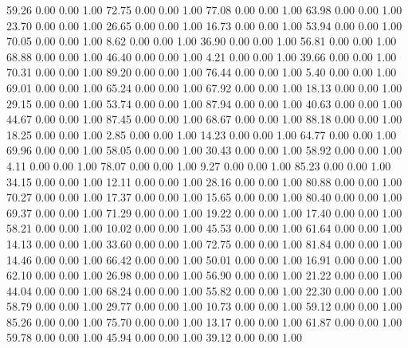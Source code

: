    59.26   0.00   0.00   1.00
   72.75   0.00   0.00   1.00
   77.08   0.00   0.00   1.00
   63.98   0.00   0.00   1.00
   23.70   0.00   0.00   1.00
   26.65   0.00   0.00   1.00
   16.73   0.00   0.00   1.00
   53.94   0.00   0.00   1.00
   70.05   0.00   0.00   1.00
    8.62   0.00   0.00   1.00
   36.90   0.00   0.00   1.00
   56.81   0.00   0.00   1.00
   68.88   0.00   0.00   1.00
   46.40   0.00   0.00   1.00
    4.21   0.00   0.00   1.00
   39.66   0.00   0.00   1.00
   70.31   0.00   0.00   1.00
   89.20   0.00   0.00   1.00
   76.44   0.00   0.00   1.00
    5.40   0.00   0.00   1.00
   69.01   0.00   0.00   1.00
   65.24   0.00   0.00   1.00
   67.92   0.00   0.00   1.00
   18.13   0.00   0.00   1.00
   29.15   0.00   0.00   1.00
   53.74   0.00   0.00   1.00
   87.94   0.00   0.00   1.00
   40.63   0.00   0.00   1.00
   44.67   0.00   0.00   1.00
   87.45   0.00   0.00   1.00
   68.67   0.00   0.00   1.00
   88.18   0.00   0.00   1.00
   18.25   0.00   0.00   1.00
    2.85   0.00   0.00   1.00
   14.23   0.00   0.00   1.00
   64.77   0.00   0.00   1.00
   69.96   0.00   0.00   1.00
   58.05   0.00   0.00   1.00
   30.43   0.00   0.00   1.00
   58.92   0.00   0.00   1.00
    4.11   0.00   0.00   1.00
   78.07   0.00   0.00   1.00
    9.27   0.00   0.00   1.00
   85.23   0.00   0.00   1.00
   34.15   0.00   0.00   1.00
   12.11   0.00   0.00   1.00
   28.16   0.00   0.00   1.00
   80.88   0.00   0.00   1.00
   70.27   0.00   0.00   1.00
   17.37   0.00   0.00   1.00
   15.65   0.00   0.00   1.00
   80.40   0.00   0.00   1.00
   69.37   0.00   0.00   1.00
   71.29   0.00   0.00   1.00
   19.22   0.00   0.00   1.00
   17.40   0.00   0.00   1.00
   58.21   0.00   0.00   1.00
   10.02   0.00   0.00   1.00
   45.53   0.00   0.00   1.00
   61.64   0.00   0.00   1.00
   14.13   0.00   0.00   1.00
   33.60   0.00   0.00   1.00
   72.75   0.00   0.00   1.00
   81.84   0.00   0.00   1.00
   14.46   0.00   0.00   1.00
   66.42   0.00   0.00   1.00
   50.01   0.00   0.00   1.00
   16.91   0.00   0.00   1.00
   62.10   0.00   0.00   1.00
   26.98   0.00   0.00   1.00
   56.90   0.00   0.00   1.00
   21.22   0.00   0.00   1.00
   44.04   0.00   0.00   1.00
   68.24   0.00   0.00   1.00
   55.82   0.00   0.00   1.00
   22.30   0.00   0.00   1.00
   58.79   0.00   0.00   1.00
   29.77   0.00   0.00   1.00
   10.73   0.00   0.00   1.00
   59.12   0.00   0.00   1.00
   85.26   0.00   0.00   1.00
   75.70   0.00   0.00   1.00
   13.17   0.00   0.00   1.00
   61.87   0.00   0.00   1.00
   59.78   0.00   0.00   1.00
   45.94   0.00   0.00   1.00
   39.12   0.00   0.00   1.00
